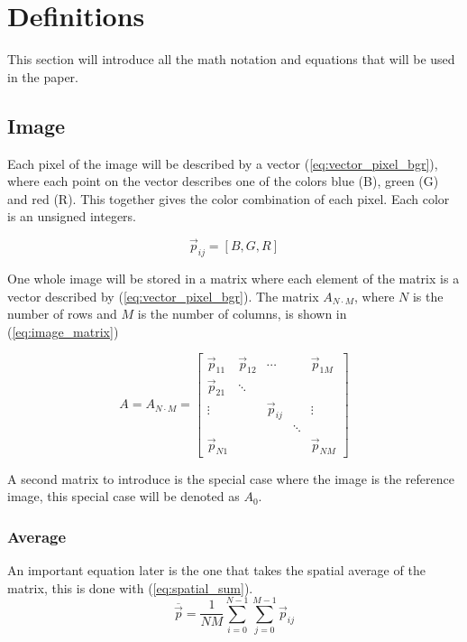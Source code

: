 \documentclass{article}
\newcommand*\mean[1]{\overline{#1}}
\begin{document}
\section{Definitions}
This section will introduce all the math notation and equations that will be used in the paper. 

\subsection{Image}

Each pixel of the image will be described by a vector (\ref{eq:vector_pixel_bgr}), where each point on the vector describes one of the colors blue (B), green (G) and red (R).  This together gives the color combination of each pixel. Each color is an unsigned integers. 


\begin{equation}
    \label{eq:vector_pixel_bgr}
    \vec{p}_{ij} = [B,G,R]
\end{equation} 

One whole image will be stored in a matrix where each element of the matrix is a vector described by (\ref{eq:vector_pixel_bgr}). The matrix $A_{N\cdot M}$, where $N$ is the number of rows and $M$ is the number of columns, is shown in (\ref{eq:image_matrix})

\begin{equation}
    \label{eq:image_matrix}
    A = A_{N\cdot M} =  
    \begin{bmatrix}
        \vec{p}_{11} & \vec{p}_{12} & \cdots & & \vec{p}_{1M}  \\
        \vec{p}_{21} & \ddots &        &       &                \\
        \vdots       &        &\vec{p}_{ij}&   & \vdots          \\
                     &        &        & \ddots&                  \\
        \vec{p}_{N1} &        &        &       & \vec{p}_{NM}  
    \end{bmatrix}
\end{equation}

A second matrix to introduce is the special case where the image is the reference image, this special case will be denoted as $A_0$.

\subsubsection{Average}

An important equation later is the one that takes the spatial average of the matrix, this is done with (\ref{eq:spatial_sum}).
\begin{equation}
    \label{eq:spatial_sum}
    \mean{\vec{p}} = \frac{1}{NM} \sum_{i=0}^{N-1} \sum_{j=0}^{M-1} \vec{p}_{ij}
\end{equation}
\end{document}
